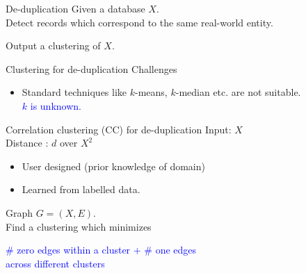 \documentclass{beamer}
\begin{document}
\begin{frame}{De-duplication}
	\onslide<1->
    Given a database $X$. \\
    \vspace{10pt}\alert{Detect} records which correspond to the same real-world entity.
    
    \vspace{30pt}Output a clustering of $X$.
    
\end{frame}

\begin{frame}{Clustering for de-duplication}
	Challenges\\
    \begin{itemize}
    	\vspace{20pt}\item Standard techniques like $k$-means, $k$-median etc. are not suitable.\\
    	\textcolor{blue}{$k$ is unknown.}
	\end{itemize}    	
\end{frame}

\begin{frame}{Correlation clustering (CC) for de-duplication}
	Input: $X$\\
	Distance   : $d$ over $X^2$\\
	\begin{itemize}
		\item User designed (prior knowledge of domain) 
		\item Learned from labelled data.
	\end{itemize}
	 
	\vspace{20pt}Graph $G = (X, E)$. \\
    \vspace{10pt}Find a clustering which minimizes
    
    \begin{center}
    \textcolor{blue}{\# zero edges within a cluster + \# one edges\\ across different clusters}
    \end{center}
    
\end{frame}
\end{document}
